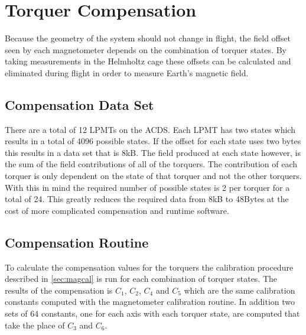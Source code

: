 \section{Torquer Compensation}

Because the geometry of the system should not change in flight, the field offset seen by each magnetometer depends on the combination of torquer states. By taking measurements in the Helmholtz cage these offsets can be calculated and eliminated during flight in order to measure Earth's magnetic field.

\subsection{Compensation Data Set}

There are a total of 12 \acp{LPMT} on the \ac{ACDS}. Each \ac{LPMT} has two states which results in a total of 4096 possible states. If the offset for each state uses two bytes this results in a data set that is 8kB. The field produced at each state however, is the sum of the field contributions of all of the torquers. The contribution of each torquer is only dependent on the state of that torquer and not the other torquers. With this in mind the required number of possible states is 2 per torquer for a total of 24. This greatly reduces the required data from 8kB to 48Bytes at the cost of more complicated compensation and runtime software.

\subsection{Compensation Routine}

To calculate the compensation values for the torquers the calibration procedure described in \cref{sec:magcal} is run for each combination of torquer states. The results of the compensation is $C_1$, $C_2$, $C_4$ and $ C_5$ which are the same calibration constants computed with the magnetometer calibration routine. In addition two sets of 64 constants, one for each axis with each torquer state, are computed that take the place of $C_3$ and $C_6$.

